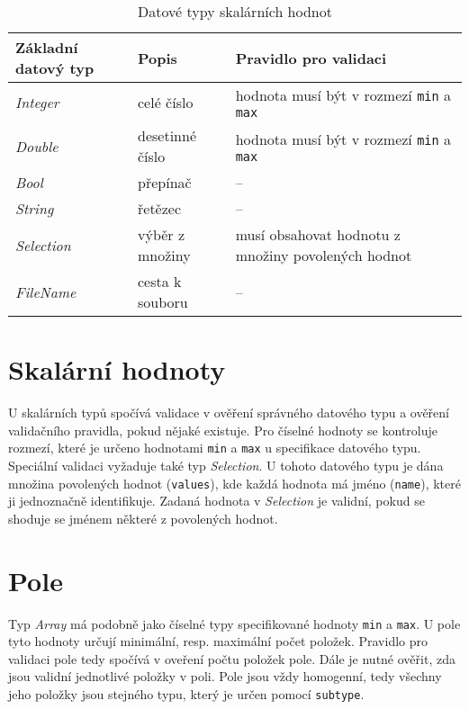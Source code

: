 \documentclass[FM,MP]{tulthesis}
\begin{document}
	\begin{table}[h]
		\centering
		\caption{Datové typy skalárních hodnot}
		\label{tab:typy-skalaru}
		\begin{tabular}{|l|l|l|}
		\hline
		\textbf{Základní datový typ} & \textbf{Popis}           & \textbf{Pravidlo pro validaci}                                            \\
		\hline
		\textit{Integer}    & celé číslo      & hodnota musí být v rozmezí \texttt{min} a \texttt{max}               \\
		\textit{Double}     & desetinné číslo & hodnota musí být v rozmezí \texttt{min} a \texttt{max}               \\
		\textit{Bool}       & přepínač        & --                                                  \\
		\textit{String}     & řetězec         & --                                                  \\
		\textit{Selection}  & výběr z množiny & \parbox[t]{7cm}{musí obsahovat hodnotu z množiny povolených hodnot} \\
		\textit{FileName}   & cesta k souboru & --                                                  \\
		\hline
		\end{tabular}
	\end{table}

	\section{Skalární hodnoty}
		U skalárních typů spočívá validace v ověření správného datového typu a ověření validačního pravidla, pokud nějaké existuje. Pro číselné hodnoty se kontroluje rozmezí, které je určeno hodnotami \texttt{min} a \texttt{max} u specifikace datového typu. Speciální validaci vyžaduje také typ \textit{Selection}. U tohoto datového typu je dána množina povolených hodnot (\texttt{values}), kde každá hodnota má jméno (\texttt{name}), které ji jednoznačně identifikuje. Zadaná hodnota v \textit{Selection} je validní, pokud se shoduje se jménem některé z povolených hodnot.

	\section{Pole}
		Typ \textit{Array} má podobně jako číselné typy specifikované hodnoty \texttt{min} a \texttt{max}. U pole tyto hodnoty určují minimální, resp. maximální počet položek. Pravidlo pro validaci pole tedy spočívá v oveření počtu položek pole. Dále je nutné ověřit, zda jsou validní jednotlivé položky v poli. Pole jsou vždy homogenní, tedy všechny jeho položky jsou stejného typu, který je určen pomocí \texttt{subtype}.
\end{document}
